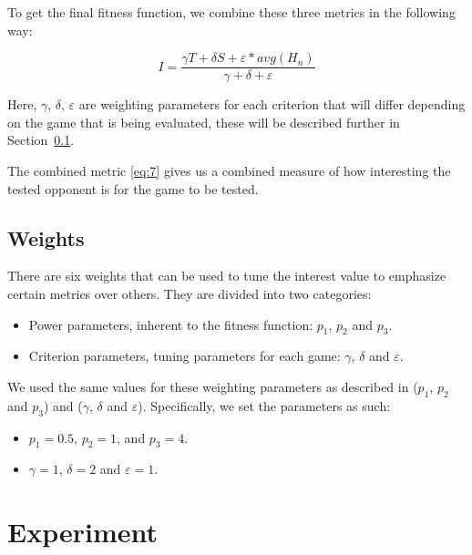 To get the final fitness function, we combine these three metrics in the following
way:

\begin{equation}
  \label{eq:7}
  I = \frac{\gamma T + \delta S + \varepsilon * avg(H_n)}{\gamma + \delta + \varepsilon}
\end{equation}

Here, \(\gamma\), \(\delta\), \(\varepsilon\) are weighting parameters for each
criterion that will differ depending on the game that is being evaluated, these
will be described further in Section~\ref{sec:weights}.

The combined metric \eqref{eq:7} gives us a combined measure of how interesting
the tested opponent is for the game to be tested.

\subsection{Weights}
\label{sec:weights}

There are six weights that can be used to tune the interest value to emphasize
certain metrics over others. They are divided into two categories:

\begin{itemize}
  \item Power parameters, inherent to the fitness function: \(p_1\), \(p_2\) and \(p_3\).
  \item Criterion parameters, tuning parameters for each game: \(\gamma\), \(\delta\) and \(\varepsilon\).
\end{itemize}

We used the same values for these weighting parameters as described in
\citet[Chap.~2.4]{yannakakis2005ai} (\(p_1\), \(p_2\) and \(p_3\)) and
\citet[Chap.~5.3.3]{yannakakis2005ai} (\(\gamma\), \(\delta\) and
\(\varepsilon\)). Specifically, we set the parameters as such:

\begin{itemize}

   \item \(p_1=0.5\), \(p_2=1\), and \(p_3=4\).
   \item \(\gamma=1\), \(\delta=2\) and \(\varepsilon=1\).
 \end{itemize}

\section{Experiment}
\label{sec:experiment}

